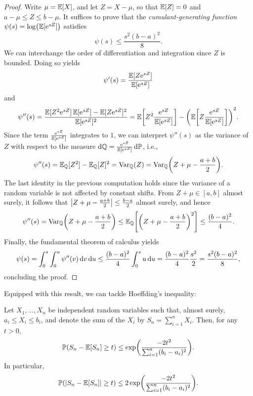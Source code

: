 \begin{proof}
Write $\mu = \operatorname{\mathbb{E}}[X]$, and let $Z = X - \mu$, so that $\operatorname{\mathbb{E}}[Z] = 0$ and $a - \mu \leq Z \leq b - \mu$. It suffices to prove that the \emph{cumulant-generating function} $\psi(s) = \log(\operatorname{\mathbb{E}}[\mathrm{e}^{sZ}])$ satisfies
\[
    \psi(s) \leq \frac{s^2(b - a)^2}{8}.
\]
We can interchange the order of differentiation and integration since $Z$ is bounded. Doing so yields
\[
    \psi'(s) = \frac{\operatorname{\mathbb{E}}[Z \mathrm{e}^{sZ}]}{\operatorname{\mathbb{E}}[\mathrm{e}^{sZ}]}
\]
and
\[
    \psi''(s) = \frac{\Exp[Z^2 \e^{sZ}] \Exp[\e^{sZ}] - \Exp[Z \e^{sZ}]^2}{\Exp[\e^{sZ}]^2} = \Exp\left[ Z^2 \frac{\e^{sZ}}{\Exp[\e^{sZ}]} \right] - \left(\Exp\left[ Z \frac{\e^{sZ}}{\Exp[\e^{sZ}]} \right]\right)^2.
\]
Since the term $\frac{\mathrm{e}^{sZ}}{\operatorname{\mathbb{E}}[\mathrm{e}^{sZ}]}$ integrates to $1$, we can interpret $\psi''(s)$ as the variance of $Z$ with respect to the measure $\mathrm{d}\mathbb{Q} = \frac{\mathrm{e}^{sZ}}{\operatorname{\mathbb{E}}[\mathrm{e}^{sZ}]} \, \mathrm{d}\mathbb{P}$, i.e.,
\[
    \psi''(s) = \Exp_{\mathbb{Q}}[Z^2] - \Exp_{\mathbb{Q}}[Z]^2 = \Var_{\mathbb{Q}}(Z) = \Var_{\mathbb{Q}}\left( Z + \mu - \frac{a + b}{2} \right).
\]
The last identity in the previous computation holds since the variance of a random variable is not affected by constant shifts. From $Z + \mu \in [a,b]$ almost surely, it follows that $\abs{Z + \mu - \frac{a+b}{2}} \leq \frac{b-a}{2}$ almost surely, and hence
\[
    \psi''(s) = \Var_{\mathbb{Q}}\left( Z + \mu - \frac{a + b}{2} \right) \leq \Exp_{\mathbb{Q}}\left[\left( Z + \mu - \frac{a + b}{2} \right)^2\right] \leq \frac{(b - a)^2}{4}.
\]
Finally, the fundamental theorem of calculus yields
\[
    \psi(s) = \int_0^s \int_0^u \psi''(v) \, \mathrm{d}v \, \mathrm{d}u \leq \frac{(b - a)^2}{4} \int_0^s u \, \mathrm{d}u = \frac{(b - a)^2}{4} \frac{s^2}{2} = \frac{s^2 (b - a)^2}{8},
\]
concluding the proof.
\end{proof}

Equipped with this result, we can tackle Hoeffding's inequality:

\begin{theorem}[Hoeffding, 1963]
\label{thm: hoeffding}
Let $X_1, \dots, X_n$ be independent random variables such that, almost surely, $a_i \leq X_i \leq b_i$, and denote the sum of the $X_i$ by $S_n = \sum_{i=1}^n X_i$. Then, for any $t>0$,
\[
    \operatorname{\mathbb{P}}(S_n - \operatorname{\mathbb{E}}[S_n] \geq t) \leq \exp(\frac{-2t^2}{\sum_{i=1}^n (b_i - a_i)^2}).
\]
In particular,
\[
    \operatorname{\mathbb{P}}(\abs{S_n - \operatorname{\mathbb{E}}[S_n]} \geq t) \leq 2 \exp(\frac{-2t^2}{\sum_{i=1}^n (b_i - a_i)^2}).
\]
\end{theorem}

